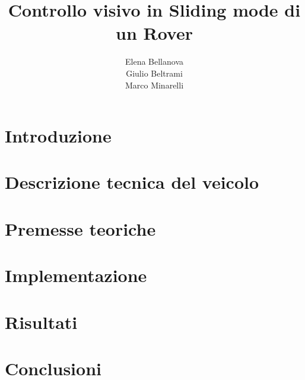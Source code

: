 \documentclass{article}
\title{Controllo visivo in Sliding mode di un Rover}
\author{Elena Bellanova \\ Giulio Beltrami \\ Marco Minarelli}
\date{}
\begin{document}


\tableofcontents

\clearpage
\section{Introduzione}


\section{Descrizione tecnica del veicolo} 


\section{Premesse teoriche}


\section{Implementazione}


\section{Risultati}


\section{Conclusioni}


\nocite{*}


\end{document}
